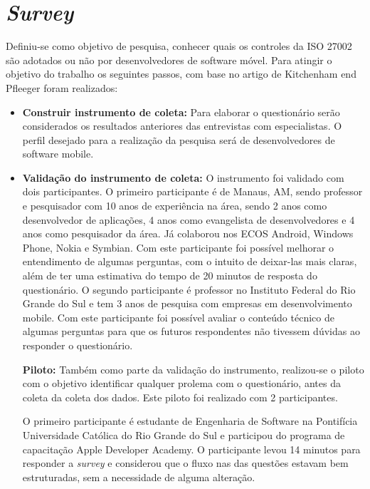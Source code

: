 \section{\textbf{\textit{Survey}}} Definiu-se como objetivo de pesquisa, conhecer quais os controles da ISO 27002 são adotados ou não por desenvolvedores de software móvel. Para atingir o objetivo do trabalho os seguintes passos, com base no artigo de Kitchenham end Pfleeger \cite{pfleeger2001principles} foram realizados:
\begin{itemize}

\item \textbf{Construir instrumento de coleta:} Para elaborar o questionário serão considerados os resultados anteriores das entrevistas com especialistas. O perfil desejado para a realização da pesquisa será de desenvolvedores de software mobile.

\item \textbf{Validação do instrumento de coleta:} O instrumento foi validado com dois participantes. O primeiro participante é de Manaus, AM, sendo professor e pesquisador com 10 anos de experiência na área, sendo 2 anos como desenvolvedor de aplicações, 4 anos como evangelista de desenvolvedores e 4 anos como pesquisador da área. Já colaborou nos ECOS Android, Windows Phone, Nokia e Symbian. Com este participante foi possível  melhorar o entendimento de algumas perguntas, com o intuito de deixar-las mais claras, além de ter uma estimativa do tempo de 20 minutos de resposta do questionário. O segundo participante é professor no Instituto Federal do Rio Grande do Sul e tem 3 anos de pesquisa com empresas em desenvolvimento mobile. Com este participante foi possível avaliar o conteúdo técnico de algumas perguntas para que os futuros respondentes não tivessem dúvidas ao responder o questionário.



 \textbf{Piloto:} Também como parte da validação do instrumento, realizou-se o piloto com o objetivo identificar qualquer prolema com o questionário, antes da coleta da coleta dos dados. Este piloto foi realizado com 2 participantes. 
 
 O primeiro participante é estudante de Engenharia de Software na Pontifícia Universidade Católica do Rio Grande do Sul e participou do programa de capacitação Apple Developer Academy. O participante levou  14 minutos para responder a \textit{survey} e considerou que o fluxo nas das questões estavam bem estruturadas, sem a necessidade de alguma alteração.
 

\end{itemize}
